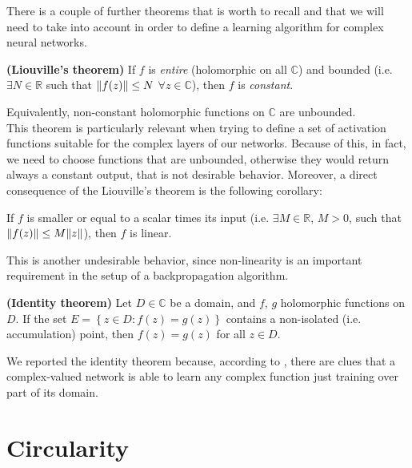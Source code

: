 \documentclass[../main.tex]{subfiles}
\begin{document}
There is a couple of further theorems that is worth to recall and that we will need to take into account in order to define a learning algorithm for complex neural networks.
\begin{theorem}
\textbf{(Liouville's theorem)} If $f$ is \textit{entire} (holomorphic on all $\mathds{C}$) and bounded (i.e. $\exists N\in\mathds{R}$ such that $\norm{f(z)}\leq N$ $\forall z\in\mathds{C}$), then $f$ is \textit{constant}.
\label{th:Liouville}
\end{theorem}
Equivalently, non-constant holomorphic functions on $\mathds{C}$ are unbounded.\\
This theorem is particularly relevant when trying to define a set of activation functions suitable for the complex layers of our networks. Because of this, in fact, we need to choose functions that are unbounded, otherwise they would return always a constant output, that is not desirable behavior. Moreover, a direct consequence of the Liouville's theorem is the following corollary:
\begin{corollary}
If $f$ is smaller or equal to a scalar times its input (i.e. $\exists M\in\mathds{R}$, $M>0$, such that $\norm{f(z)}\leq M\norm{z}$), then $f$ is linear.
\end{corollary}
This is another undesirable behavior, since non-linearity is an important requirement in the setup of a backpropagation algorithm.
\begin{theorem}
\textbf{(Identity theorem)} Let $D\in\mathds{C}$ be a domain, and $f$, $g$ holomorphic functions on $D$. If the set $E = \left\{z\in D: f(z)=g(z)\right\}$ contains a non-isolated (i.e. accumulation) point, then $f(z)=g(z)$ for all $z\in D$.
\label{th:identity}
\end{theorem}
We reported the identity theorem because, according to \cite{Nitta_complexBP}, there are clues that a complex-valued network is able to learn any complex function just training over part of its domain.

\section{Circularity}
\label{sec:circularity}
\end{document}
